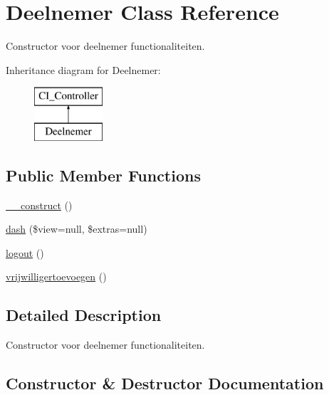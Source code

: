 \hypertarget{class_deelnemer}{}\section{Deelnemer Class Reference}
\label{class_deelnemer}


Constructor voor deelnemer functionaliteiten.  


Inheritance diagram for Deelnemer\+:\begin{figure}[H]
\begin{center}
\leavevmode
\includegraphics[height=2.000000cm]{class_deelnemer}
\end{center}
\end{figure}
\subsection*{Public Member Functions}
\begin{DoxyCompactItemize}
\item 
\mbox{\hyperlink{class_deelnemer_a095c5d389db211932136b53f25f39685}{\+\_\+\+\_\+construct}} ()
\item 
\mbox{\hyperlink{class_deelnemer_a35f5125b52883ea70807c42282f60b54}{dash}} (\$view=null, \$extras=null)
\item 
\mbox{\hyperlink{class_deelnemer_a082405d89acd6835c3a7c7a08a7adbab}{logout}} ()
\item 
\mbox{\hyperlink{class_deelnemer_a4ad528eb297f8dc0084b986f58fe2d2c}{vrijwilligertoevoegen}} ()
\end{DoxyCompactItemize}


\subsection{Detailed Description}
Constructor voor deelnemer functionaliteiten. 

\subsection{Constructor \& Destructor Documentation}
\mbox{\label{class_deelnemer_a095c5d389db211932136b53f25f39685}} 
